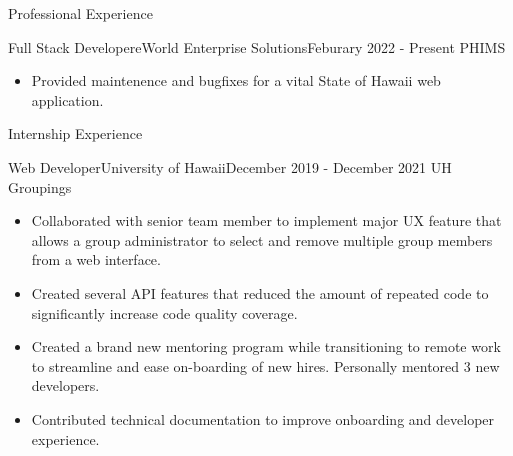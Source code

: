 \documentclass[]{mcdowellcv}
\begin{document}
	\makeheader

	\begin{cvsection}{Professional Experience}
		\begin{cvsubsection}{Full Stack Developer}{eWorld Enterprise Solutions}{Feburary 2022 - Present}
			PHIMS
			\begin{itemize}
				\item Provided maintenence and bugfixes for a vital State of Hawaii web application.
			\end{itemize}
		\end{cvsubsection}
		
	\end{cvsection}

	\begin{cvsection}{Internship Experience}
		\begin{cvsubsection}{Web Developer}{University of Hawaii}{December 2019 - December 2021}
			UH Groupings
			\begin{itemize}
				\item Collaborated with senior team member to implement major UX feature that allows a group administrator to select and remove multiple group members from a web interface.
				\item Created several API features that reduced the amount of repeated code to significantly increase code quality coverage.
				\item Created a brand new mentoring program while transitioning to remote work to streamline and ease on-boarding of new hires. Personally mentored 3 new developers.
				\item Contributed technical documentation to improve onboarding and developer experience.
			\end{itemize}
		\end{cvsubsection}
		
	\end{cvsection}
		
\end{document}
